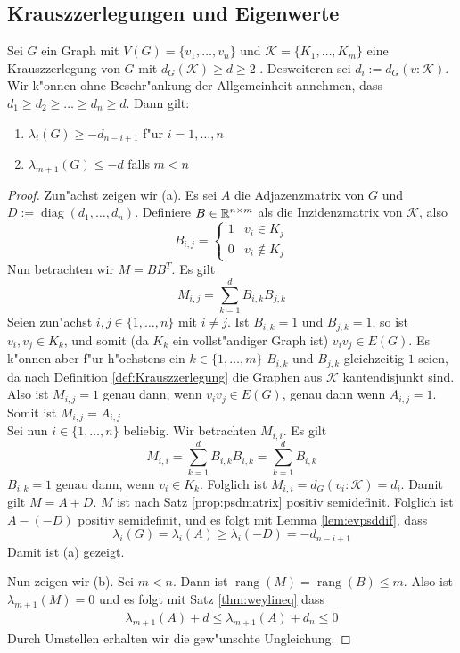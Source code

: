 \subsection{Krauszzerlegungen und Eigenwerte}

\begin{theorem}
  \label{thm:KrauszEigenwerte}
  Sei $G$ ein Graph mit $V(G)=\{v_1,\dots,v_n\}$ und $\mathcal K=\{K_1,\dots,K_m\}$ eine Krauszzerlegung von $G$ mit $d_G(\mathcal K) \geq d \geq 2$ . Desweiteren sei $d_i := d_G(v:\mathcal K)$. 
  Wir k"onnen ohne Beschr"ankung der Allgemeinheit annehmen, dass $d_1\geq d_2 \geq \dots \geq d_n \geq d$.
  Dann gilt: 
  \begin{enumerate}[label=(\alph*)]
    \item $\lambda_i(G) \geq -d_{n-i+1}$ f"ur $i = 1, \dots , n$
    \item $\lambda_{m+1}(G) \leq -d$ falls $m < n$
  \end{enumerate}
\end{theorem}
\begin{proof}
    Zun"achst zeigen wir (a). Es sei $A$ die Adjazenzmatrix von $G$ und $D := \operatorname{diag}(d_1,\dots,d_n)$. Definiere $B\in{\mathbb{R}}^{n\times m}$ als die Inzidenzmatrix von $\mathcal K$, also $$B_{i,j} = \begin{cases}
        1 & v_i \in K_j \\ 0 & v_i \notin K_j
      \end{cases}$$ 
      Nun betrachten wir $M=BB^{T}$. Es gilt
      \[
        M_{i,j} = \sum\limits_{k=1}^{d}B_{i,k}B_{j,k}
      \]
      Seien zun"achst $i,j \in \{1,\dots,n\}$ mit $i\neq j$. Ist $B_{i,k} = 1$ und $B_{j,k} = 1$, so ist $v_i,v_j  \in K_k$, und somit (da $K_k$ ein vollst"andiger Graph ist) $v_iv_j\in E(G)$. Es k"onnen aber f"ur h"ochstens ein $k\in \{1,\dots,m\}$ $B_{i,k}$ und $B_{j,k}$ gleichzeitig $1$ seien, da nach Definition \ref{def:Krauszzerlegung} die Graphen aus $\mathcal K$ kantendisjunkt sind. Also ist $M_{i,j}= 1 $ genau dann, wenn $v_iv_j\in E(G)$, genau dann wenn $A_{i,j} = 1$. Somit ist $M_{i,j}=A_{i,j}$\\
      Sei nun $i\in\{1,\dots,n\}$ beliebig. Wir betrachten $M_{i,i}$. Es gilt 
      \[
        M_{i,i} = \sum\limits_{k=1}^{d}B_{i,k}B_{i,k} = \sum\limits_{k=1}^{d} B_{i,k}
      \]
      $B_{i,k}=1$ genau dann, wenn $v_i \in K_k$. Folglich ist $M_{i,i}= d_G(v_i:\mathcal K)= d_i$. Damit gilt $M=A+D$. $M$ ist nach Satz \ref{prop:psdmatrix} positiv semidefinit.
      Folglich ist $A- (-D)$ positiv semidefinit, und es folgt mit Lemma \ref{lem:evpsddif}, dass 
      \begin{equation*}
        \lambda_i(G) = \lambda_i(A) \geq \lambda_i(-D) = -d_{n-i+1}
      \end{equation*}
      Damit ist (a) gezeigt.

     Nun zeigen wir (b). Sei $m<n$. Dann ist $\operatorname{rang}(M)= \operatorname{rang}(B) \leq m$. Also ist $\lambda_{m+1}(M) = 0$ und es folgt mit Satz \ref{thm:weylineq} dass 
      \begin{align*}
        \lambda_{m+1}(A) + d \leq \lambda_{m+1}(A) + d_{n} \leq 0
      \end{align*}
      Durch Umstellen erhalten wir die gew"unschte Ungleichung.
\end{proof}
